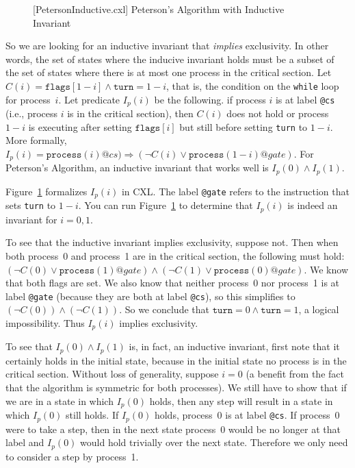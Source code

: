\documentclass{report}
\newenvironment{code}{
\tcolorbox
}{
\endtcolorbox
}
\begin{document}
\begin{figure}
\begin{code}
\end{code}
\caption{[PetersonInductive.cxl] Peterson's Algorithm with Inductive Invariant}
\label{fig:petersonproof}
\end{figure}

So we are looking for an inductive invariant that \emph{implies} exclusivity.
In other words, the set of states where the inducive invariant holds
must be a subset of the set of states where there is at most one process in
the critical section.
Let $C(i) = \mathtt{flags}[1 - i] \land
\mathtt{turn} = 1 - i$, that is, the condition on the \texttt{while} loop
for process~$i$.
Let predicate $I_p(i)$ be the following.
if process $i$ is at label \texttt{@cs} (i.e., process $i$ is in the critical section),
then $C(i)$ does not hold or process $1-i$ is executing after setting
$\mathtt{flags}[i]$ but still before setting \texttt{turn} to $1-i$.
More formally, $I_p(i) = \mathtt{process}(i)@cs) \Rightarrow (\lnot C(i) \lor \mathtt{process}(1-i)@gate)$.
For Peterson's Algorithm, an inductive invariant that works well is
$I_p(0) \land I_p(1)$.

Figure~\ref{fig:petersonproof} formalizes $I_p(i)$ in CXL.
The label \texttt{@gate} refers to the instruction that sets \texttt{turn} to $1-i$.
You can run Figure~\ref{fig:petersonproof} to determine
that $I_p(i)$ is indeed an invariant for $i = 0, 1$.

To see that the inductive invariant implies exclusivity, suppose not.  Then
when both process~0 and process~1 are in the critical section, the
following must hold:
$(\lnot C(0) \lor \mathtt{process}(1)@gate) \land
 (\lnot C(1) \lor \mathtt{process}(0)@gate)$.
We know that both flags are set.
We also know that neither process~0 nor process~1 is at label \texttt{@gate}
(because they are both at label \texttt{@cs}),
so this simplifies to $(\lnot C(0)) \land (\lnot C(1))$.
So we conclude that $\mathtt{turn} = 0 \land \mathtt{turn} = 1$, a
logical impossibility.  Thus $I_p(i)$ implies exclusivity.

To see that $I_p(0) \land I_p(1)$ is, in fact, an inductive invariant, first note that
it certainly holds in the initial state, because in the initial state no process
is in the critical section.
Without loss of generality, suppose $i=0$ (a benefit from the fact that the algorithm is
symmetric for both processes).  We still have to show that if we are in a state
in which $I_p(0)$ holds, then any step will result in a state in which
$I_p(0)$ still holds.
If $I_p(0)$ holds, process~0 is at label \texttt{@cs}.  If process~0
were to take a step, then in the next state process~0 would be no longer
at that label and $I_p(0)$ would hold trivially over the next state.
Therefore we only need to consider a step by process~1.
\end{document}
